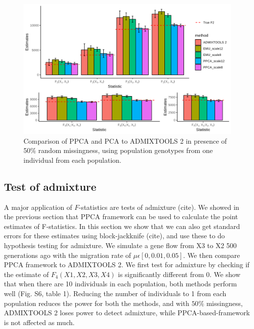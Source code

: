 \documentclass[12pt, letterpaper]{article}
\begin{document}
\begin{figure}[ht!]
    \includegraphics[width=16.5cm]{plots/simfiles/Ne1000/split_times1000/npop10_nind100/missing0.5/plots_8_12/mu0.05_plot_all_1ind_missing.png}
    \centering
    \caption{Comparison of PPCA and PCA to ADMIXTOOLS 2 in presence of 50\% random missingness, using population genotypes from one individual from each population.}
    \label{figS2:pc_scale}
\end{figure}


\subsection{Test of admixture}
A major application of $F$-statistics are tests of admixture (cite). We showed in the previous section that PPCA framework can be used to calculate the point estimates of F-statistics. In this section we show that we can also get standard errors for these estimates using block-jackknife (cite), and use these to do hypothesis testing for admixture. We simulate a gene flow from X3 to X2 500 generations ago with the migration rate of $\mu \epsilon [0, 0.01, 0.05]$. We then compare PPCA framework to ADMIXTOOLS 2. We first test for admixture by checking if the estimate of $F_4(X1,X2,X3,X4)$ is significantly different from 0. We show that when there are 10 individuals in each population, both methods perform well (Fig. S6, table 1). Reducing the number of individuals to 1 from each population reduces the power for both the methods, and with $50\%$ missingness, ADMIXTOOLS 2 loses power to detect admixture, while PPCA-based-framework is not affected as much.
\end{document}
